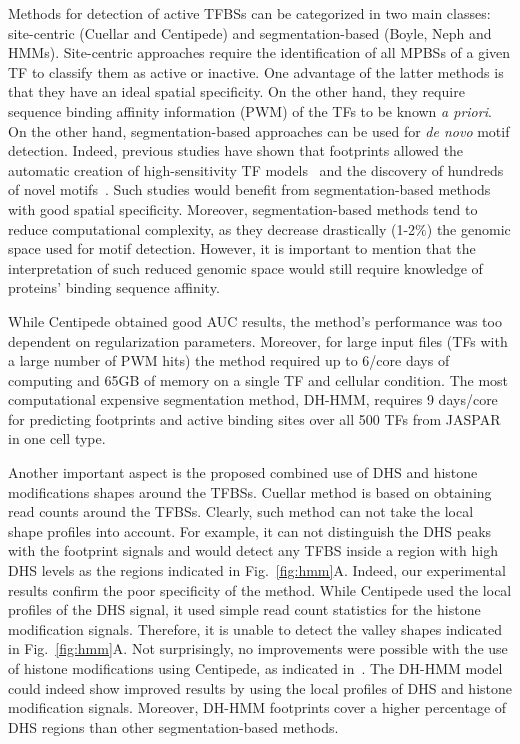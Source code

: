 \documentclass{bioinfo}
\begin{document}
Methods for detection of active TFBSs can be categorized in two main classes:
site-centric (Cuellar and Centipede) and segmentation-based (Boyle, Neph and
HMMs). Site-centric approaches require the identification of all MPBSs of a
given TF to classify them as active or inactive. One advantage of the latter
methods is that they have an ideal spatial specificity. On the other
hand, they require sequence binding affinity information (PWM) of the TFs to
be known {\color{red}\emph{a priori}}. On the other hand, segmentation-based approaches can be
used for \emph{de novo} motif detection. Indeed, previous studies have shown
that footprints allowed the automatic creation of high-sensitivity TF
models~\citep{kulakovskiy2009} and the discovery of hundreds of novel
motifs~\citep{neph2012a}. Such studies would benefit from segmentation-based
methods with good spatial specificity. Moreover, segmentation-based methods
tend to reduce computational complexity, as they decrease drastically (1-2$\%$)
the genomic space used for motif detection.
{\color{red} However, it is important to mention that the interpretation of such
reduced genomic space would still require knowledge of proteins' binding sequence affinity.}

While Centipede obtained good AUC results, the method's performance was too
dependent on regularization parameters. Moreover, for large input files (TFs
with a large number of PWM hits) the method required up to 6/core days of computing
and 65GB of memory on a single TF and cellular condition. The
most computational expensive segmentation method, DH-HMM, requires 9 days/core for
predicting footprints and active binding sites over all 500 TFs from JASPAR in one
cell type.

Another important aspect is the proposed combined use of DHS and histone
modifications shapes around the TFBSs. Cuellar method is based on obtaining
read counts around the TFBSs. Clearly, such method can not take the local
shape profiles into account. For example, it can not distinguish the DHS peaks
with the footprint signals and would detect any TFBS inside a region with high
DHS levels as the regions indicated in Fig.~\ref{fig:hmm}A. Indeed, our experimental
results confirm the poor specificity of the method. While Centipede used the
local profiles of the DHS signal, it used simple read count statistics for the
histone modification signals. Therefore, it is unable to detect the valley shapes indicated in
Fig.~\ref{fig:hmm}A. Not surprisingly, no improvements were possible with the use
of histone modifications using Centipede, as indicated in~\cite{pique2011}. The
DH-HMM model could indeed show improved results by using the local profiles of DHS and histone modification signals. {\color{red} Moreover, DH-HMM footprints cover a higher percentage of DHS regions than other segmentation-based methods}. 
\end{document}
